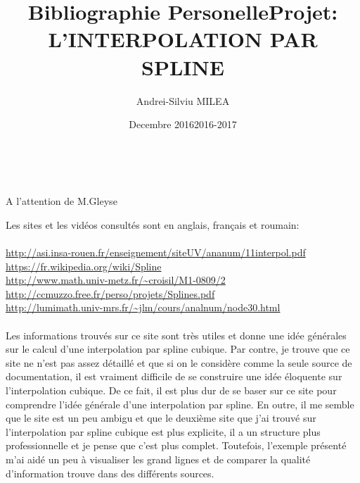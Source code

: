 \documentclass{article}
\title{Bibliographie Personelle}
\author{Andrei-Silviu MILEA}
\date{Decembre 2016}
\begin{document}
\maketitle

\vspace{10\baselineskip}
\begin{center}
\makeatother
\title{Projet: L'INTERPOLATION PAR SPLINE}\\
\end{center}

\vspace{12\baselineskip}
\begin{center}
A l'attention de M.Gleyse\\
\date{2016-2017}
\end{center}

\newpage
\begingroup\raggedleft
Les sites et les vid\'{e}os consult\'{e}s sont en anglais, fran\c{c}ais et roumain:
\endgroup
\\\\
{\color{blue}
\url{http://asi.insa-rouen.fr/enseignement/siteUV/ananum/11interpol.pdf}\\
\url{https://fr.wikipedia.org/wiki/Spline}\\
\url{http://www.math.univ-metz.fr/~croisil/M1-0809/2}\\
\url{http://ccmuzzo.free.fr/perso/projets/Splines.pdf}\\
\url{http://lumimath.univ-mrs.fr/~jlm/cours/analnum/node30.html}}
\\\\
Les informations trouv\'{e}s sur ce site sont tr\`{e}s utiles et donne une id\'{e}e g\'{e}n\'{e}rales sur le calcul d'une
interpolation par spline cubique. Par contre, je trouve que ce site ne n'est pas assez d\'{e}taill\'{e} et que si
on le consid\`{e}re comme la seule source de documentation, il est vraiment difficile de se construire une
id\'{e}e \'{e}loquente sur l'interpolation cubique. De ce fait, il est plus dur de se baser sur ce site pour
comprendre l'id\'{e}e g\'{e}n\'{e}rale d'une interpolation par spline. En outre, il me semble que le site est un
peu ambigu et que le deuxi\`{e}me site que j'ai trouv\'{e} sur l'interpolation par spline cubique est plus
explicite, il a un structure plus professionnelle et je pense que c'est plus complet. Toutefois,
l'exemple pr\'{e}sent\'{e} m'ai aid\'{e} un peu \`{a} visualiser les grand lignes et de comparer la qualit\'{e}
d'information trouve dans des diff\'{e}rents sources.
\\\\
\end{document}

